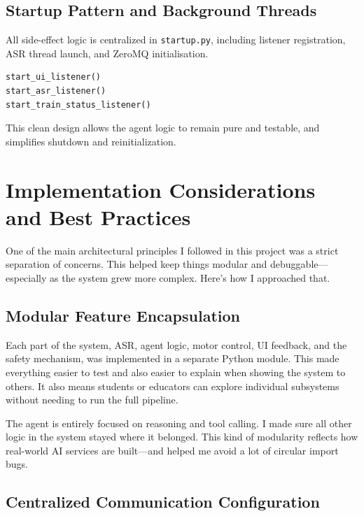 \subsection{Startup Pattern and Background Threads}

All side-effect logic is centralized in \texttt{startup.py}, including listener registration, ASR thread launch, and ZeroMQ initialisation.

\begin{lstlisting}[language=Python, caption=Startup orchestration]
start_ui_listener()
start_asr_listener()
start_train_status_listener()
\end{lstlisting}

This clean design allows the agent logic to remain pure and testable, and simplifies shutdown and reinitialization.

\section{Implementation Considerations and Best Practices}
\label{sec:impl-bestpractices}

One of the main architectural principles I followed in this project was a strict separation of concerns. This helped keep things modular and debuggable—especially as the system grew more complex. Here’s how I approached that.

\subsection{Modular Feature Encapsulation}

Each part of the system, ASR, agent logic, motor control, UI feedback, and the safety mechanism, was implemented in a separate Python module. This made everything easier to test and also easier to explain when showing the system to others. It also means students or educators can explore individual subsystems without needing to run the full pipeline.

The agent is entirely focused on reasoning and tool calling. I made sure all other logic in the system stayed where it belonged. This kind of modularity reflects how real-world AI services are built—and helped me avoid a lot of circular import bugs.

\subsection{Centralized Communication Configuration}

